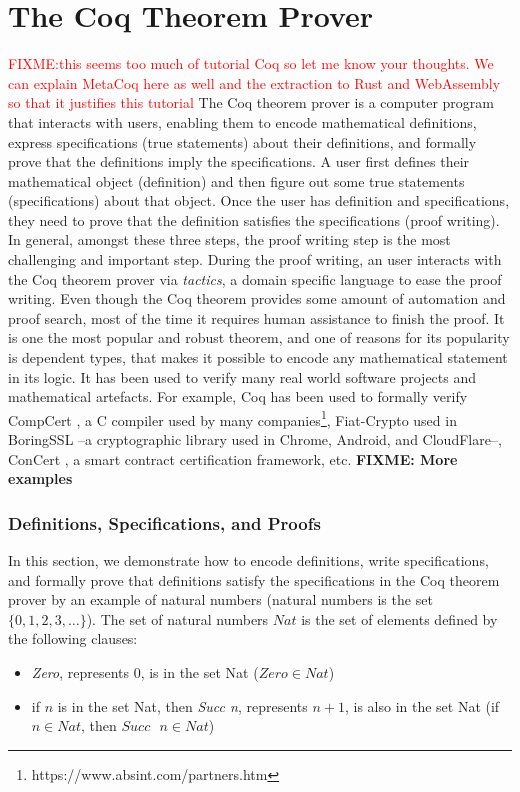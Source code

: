 \documentclass[conference,compsoc]{IEEEtran}
\begin{document}
\section{The Coq Theorem Prover}
\textcolor{red}{FIXME:this seems too much of tutorial Coq so let me know your thoughts. We 
can explain MetaCoq here as well and the extraction to Rust and WebAssembly
so that it justifies this tutorial}
The Coq theorem prover \cite{the_coq_development_team} is a computer program that interacts with users, 
enabling them to encode mathematical definitions, express specifications (true statements) about 
their definitions, and formally prove that the definitions imply the specifications. 
A user first defines their mathematical object (definition) and then figure 
out some  true statements (specifications) about 
that object. Once the user has definition 
and specifications, they need to prove 
that the definition satisfies the specifications 
(proof writing). In general, amongst these three steps, 
the proof writing step is the most challenging and important step. 
During the proof writing, an user interacts with the Coq theorem prover 
via \emph{tactics}, a domain specific language 
to ease the proof writing. Even though the Coq theorem 
provides some amount of automation and proof 
search, most of the time it requires human assistance to finish the proof. 
It is one the most popular and robust theorem, and
one of reasons for its popularity is 
dependent types, that makes it possible to encode
any mathematical statement in its logic.
It has been used to verify many real world software projects and mathematical 
artefacts. For example, Coq has been used to 
formally verify CompCert \cite{10.1145/1111037.1111042}, 
a C compiler used by many companies\footnote{https://www.absint.com/partners.htm}, 
Fiat-Crypto \cite{8835346} 
used in BoringSSL --a cryptographic library used in Chrome, Android, 
and CloudFlare--, ConCert \cite{10.1145/3372885.3373829}, 
a smart contract certification framework, etc. \textbf{FIXME: More examples}



\subsubsection*{Definitions, Specifications, and Proofs}
In this section, we demonstrate how to encode definitions, write specifications,
and formally prove that definitions satisfy the specifications 
in the Coq theorem prover by an example of 
natural numbers (natural numbers is the set $\{0, 1, 2, 3, \dots \}$). 
The set of natural numbers $Nat$ is the set of elements defined by the 
following clauses:
\begin{itemize}
  \item \emph{Zero}, represents $0$, is in the set Nat ($Zero \in Nat$)
  \item if $n$ is in the set Nat, then \emph{Succ n}, represents $n + 1$, 
    is also in the set Nat (if $n \in Nat$, then $Succ \text{ }n \in Nat$)
\end{itemize}
\end{document}
